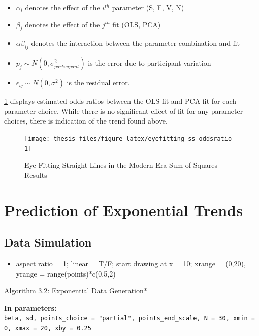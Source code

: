 \documentclass[print]{nuthesis}
\providecommand{\tightlist}{%
  \setlength{\itemsep}{0pt}\setlength{\parskip}{0pt}}
\begin{document}
\begin{itemize}
\tightlist
\item
  \(\alpha_i\) denotes the effect of the \(i^{th}\) parameter (S, F, V, N)
\item
  \(\beta_j\) denotes the effect of the \(j^{th}\) fit (OLS, PCA)
\item
  \(\alpha\beta_{ij}\) denotes the interaction between the parameter combination and fit
\item
  \(p_{j} \sim N(0, \sigma^2_{participant})\) is the error due to participant variation
\item
  \(\epsilon_{ij} \sim N(0, \sigma^2)\) is the residual error.
\end{itemize}

\cref{fig:eyefitting-ss-oddsratio} displays estimated odds ratios between the OLS fit and PCA fit for each parameter choice.
While there is no significant effect of fit for any parameter choices, there is indication of the trend found above.

\begin{figure}[tbp]

{\centering \texttt{[image: thesis\_files/figure-latex/eyefitting-ss-oddsratio-1]} 

}

\caption{Eye Fitting Straight Lines in the Modern Era Sum of Squares Results}\label{fig:eyefitting-ss-oddsratio}
\end{figure}

\hypertarget{prediction-of-exponential-trends}{%
\section{Prediction of Exponential Trends}\label{prediction-of-exponential-trends}}

\hypertarget{data-simulation-1}{%
\subsection{Data Simulation}\label{data-simulation-1}}

\begin{itemize}
\tightlist
\item
  aspect ratio = 1; linear = T/F; start drawing at x = 10; xrange = (0,20), yrange = range(points)*c(0.5,2)
\end{itemize}

\noindent *Algorithm 3.2: Exponential Data Generation*

\textbf{In parameters:} \texttt{beta,\ sd,\ points\_choice\ =\ "partial",\ points\_end\_scale,\ N\ =\ 30,\ xmin\ =\ 0,\ xmax\ =\ 20,\ xby\ =\ 0.25}
\end{document}
